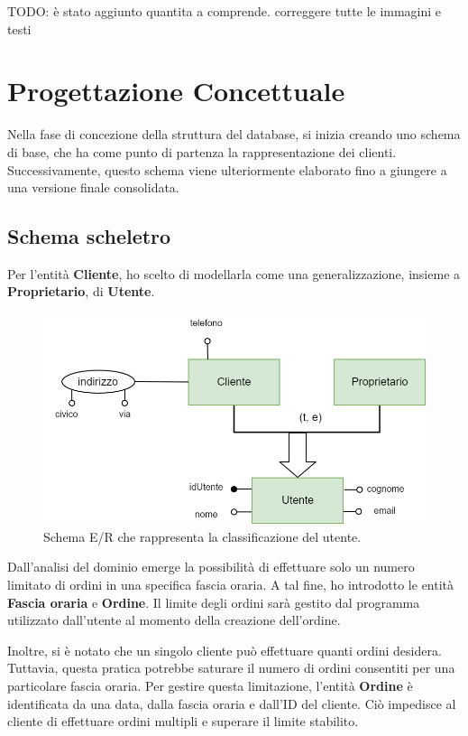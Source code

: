 \documentclass[a4paper,12pt, oneside]{article}
\begin{document}
TODO: è stato aggiunto quantita a comprende. correggere tutte le immagini e testi

\section{Progettazione Concettuale}

Nella fase di concezione della struttura del database, si inizia
creando uno schema di base, che ha come punto di partenza la
rappresentazione dei clienti. Successivamente, questo schema
viene ulteriormente elaborato fino a giungere a una versione
finale consolidata.

\subsection{Schema scheletro}

Per l'entità \textbf{Cliente}, ho scelto di modellarla come una
generalizzazione, insieme a \textbf{Proprietario}, di \textbf{Utente}.

\begin{figure}[ht]
    \centering
    \includegraphics[width=1\textwidth]{images/diagramma_cliente.png}
    \caption{Schema E/R che rappresenta la classificazione del utente.}
    \label{fig:diagramma_cliente}
\end{figure}

Dall'analisi del dominio emerge la possibilità di effettuare solo
un numero limitato di ordini in una specifica fascia oraria. A tal
fine, ho introdotto le entità \textbf{Fascia oraria} e
\textbf{Ordine}. Il limite degli ordini sarà gestito dal programma
utilizzato dall'utente al momento della creazione dell'ordine.

Inoltre, si è notato che un singolo cliente può effettuare quanti
ordini desidera. Tuttavia, questa pratica potrebbe saturare il
numero di ordini consentiti per una particolare fascia oraria.
Per gestire questa limitazione, l'entità \textbf{Ordine} è
identificata da una data, dalla fascia oraria e dall'ID del
cliente. Ciò impedisce al cliente di effettuare ordini multipli
e superare il limite stabilito.
\end{document}
